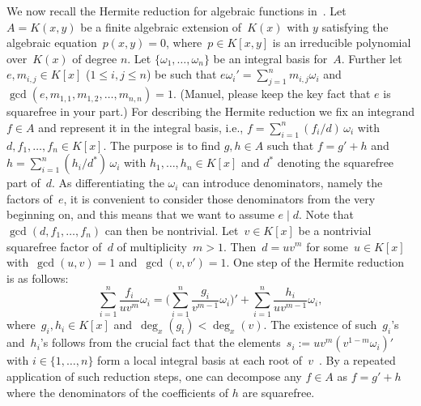 \documentclass{sig-alternate}
\newcommand{\red}{\color{red}}
\begin{document}
We now recall the Hermite reduction for algebraic functions in~\cite{trager84}.
Let~$A= K(x, y)$ be a finite algebraic extension of~$K(x)$ with $y$ satisfying
the algebraic equation~$p(x, y)=0$, where~$p\in K[x, y]$ is an irreducible
polynomial over~$K(x)$ of degree $n$.
Let $\{\omega_1,\ldots,\omega_n\}$ be an integral basis for~$A$.
Further let $e, m_{i,j}\in K[x]$ ($1\leq i,j\leq n$) be such that
$e\omega_i'=\sum_{j=1}^n m_{i,j}\omega_i$ and
$\gcd(e,m_{1,1},m_{1,2},\ldots,m_{n,n})=1$.
{\red (Manuel, please keep the key fact that $e$ is squarefree in your part.)}
For describing the Hermite reduction we fix an integrand $f\in A$ and represent it in the
integral basis, i.e., $f=\sum_{i=1}^n (f_i/d)\,\omega_i$ with
$d,f_1,\ldots,f_n\in K[x]$. The purpose is to find $g, h\in A$ such that
$f=g' + h$ and $h=\sum_{i=1}^n(h_i/d^\ast)\,\omega_i$ with $h_1,\ldots,h_n\in K[x]$
and $d^\ast$ denoting the squarefree part of~$d$.
As differentiating the $\omega_i$ can introduce
denominators, name\-ly the factors of~$e$, it is convenient to consider those
denominators from the very beginning on, and this means that we want to assume
$e\mid d$. Note that $\gcd(d,f_1,\ldots,f_n)$ can then be nontrivial.
Let~$v\in K[x]$ be a nontrivial squarefree factor of~$d$ of multiplicity~$m>1$.
Then~$d = uv^m$ for some~$u\in K[x]$ with~$\gcd(u, v)=1$ and~$\gcd(v,v')=1$.
One step of the Hermite reduction is as follows:
\begin{equation}\label{eq:hred}
  \sum_{i=1}^n \frac{f_i}{uv^m}\omega_i =
  \biggl(\sum_{i=1}^n\frac{g_i}{v^{m-1}}\omega_i\biggr)' +
  \sum_{i=1}^n \frac{h_i}{uv^{m-1}}\omega_i,
\end{equation}
where~$g_i, h_i \in K[x]$ and~$\deg_x(g_i)< \deg_x(v)$.
The existence of such~$g_i$'s and~$h_i$'s follows from the crucial fact that
the elements~$s_i :=  uv^m(v^{1-m}\omega_i)'$ with $i\in \{ 1, \ldots, n\}$
form a local integral basis
at each root of~$v$~\cite[page 46]{trager84}.
By a repeated application of such reduction steps, one can decompose any $f\in A$
as $f=g' + h$ where the denominators of the coefficients of $h$ are squarefree.
\end{document}
